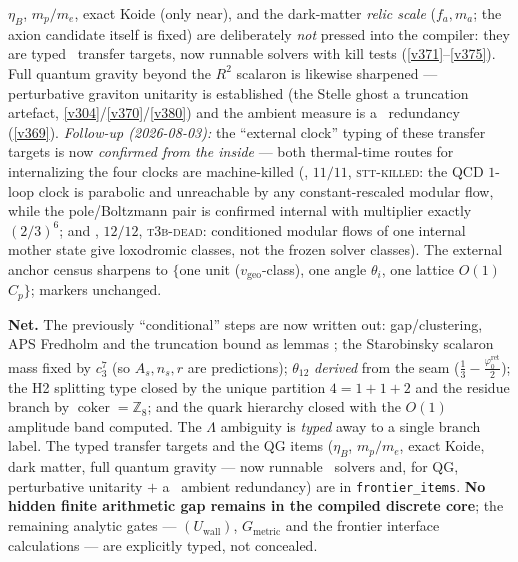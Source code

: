 \documentclass[11pt,a4paper]{article}
\newcommand{\cthree}{c_3}
\newcommand{\phiz}{\varphi_0^{\mathrm{ret}}}
\newcommand{\Z}{\mathbb{Z}}
\theoremstyle{definition}
\begin{document}
\begin{gapbox}
$\eta_B$, $m_p/m_e$, exact Koide (only near), and the dark-matter \emph{relic scale} ($f_a,m_a$; the axion
candidate itself is fixed) are deliberately \emph{not} pressed into the compiler: they are typed \mC\ transfer
targets, now runnable solvers with kill tests (\vref{v371}--\vref{v375}). Full quantum gravity beyond the $R^2$
scalaron is likewise sharpened --- perturbative graviton unitarity is established (the Stelle ghost a truncation
artefact, \vref{v304}/\vref{v370}/\vref{v380}) and the ambient measure is a \mC\ redundancy (\vref{v369}).
\emph{Follow-up (2026-08-03):} the ``external clock'' typing of these transfer targets is now
\emph{confirmed from the inside} --- both thermal-time routes for internalizing the four clocks are
machine-killed (, $11/11$, \textsc{stt-killed}: the QCD $1$-loop
clock is parabolic and unreachable by any constant-rescaled modular flow, while the pole/Boltzmann
pair is confirmed internal with multiplier exactly $(2/3)^6$; and
, $12/12$, \textsc{t3b-dead}: conditioned modular flows of
one internal mother state give loxodromic classes, not the frozen solver classes).  The external
anchor census sharpens to $\{$one unit ($v_{\mathrm{geo}}$-class), one angle $\theta_i$, one lattice
$O(1)$ $C_p\}$; markers unchanged.
\end{gapbox}

\noindent\textbf{Net.} The previously ``conditional'' steps are now written out: gap/clustering, APS
Fredholm and the truncation bound as lemmas \mE; the Starobinsky scalaron mass fixed by $\cthree^7$ (so
$A_s,n_s,r$ are predictions); $\theta_{12}$ \emph{derived} from the seam ($\tfrac13-\tfrac{\phiz}{2}$);
the H2 splitting type closed by the unique partition $4{=}1{+}1{+}2$ and the residue branch by
$\operatorname{coker}=\Z_8$; and the quark hierarchy closed with the $O(1)$ amplitude band computed. The
$\Lambda$ ambiguity is \emph{typed} away to a single branch label. The typed transfer targets and the QG items
($\eta_B$, $m_p/m_e$, exact Koide, dark matter, full quantum gravity --- now runnable \mC\ solvers and, for QG,
perturbative unitarity $+$ a \mC\ ambient redundancy) are in \texttt{frontier\_items}.
\textbf{No hidden finite arithmetic gap remains in the compiled discrete core}; the remaining analytic gates
--- $(U_{\mathrm{wall}})$, $G_{\mathrm{metric}}$ and the frontier interface calculations --- are explicitly
typed, not concealed.
\end{document}
